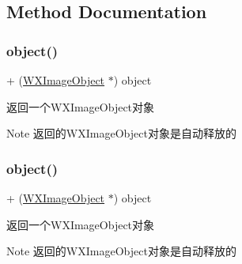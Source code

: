 \subsection{Method Documentation}
\mbox{\label{interface_w_x_image_object_a9316feca370a55f884b47c0fbabd694a}} 
\subsubsection{\texorpdfstring{object()}{object()}\hspace{0.1cm}{\footnotesize\ttfamily [1/3]}}
{\footnotesize\ttfamily + (\mbox{\hyperlink{interface_w_x_image_object}{W\+X\+Image\+Object}} $\ast$) object \begin{DoxyParamCaption}{ }\end{DoxyParamCaption}}



返回一个\+W\+X\+Image\+Object对象 

\begin{DoxyNote}{Note}
返回的\+W\+X\+Image\+Object对象是自动释放的 
\end{DoxyNote}
\mbox{\label{interface_w_x_image_object_a9316feca370a55f884b47c0fbabd694a}} 
\subsubsection{\texorpdfstring{object()}{object()}\hspace{0.1cm}{\footnotesize\ttfamily [2/3]}}
{\footnotesize\ttfamily + (\mbox{\hyperlink{interface_w_x_image_object}{W\+X\+Image\+Object}} $\ast$) object \begin{DoxyParamCaption}{ }\end{DoxyParamCaption}}



返回一个\+W\+X\+Image\+Object对象 

\begin{DoxyNote}{Note}
返回的\+W\+X\+Image\+Object对象是自动释放的 
\end{DoxyNote}
\mbox{\label{interface_w_x_image_object_a9316feca370a55f884b47c0fbabd694a}} 
